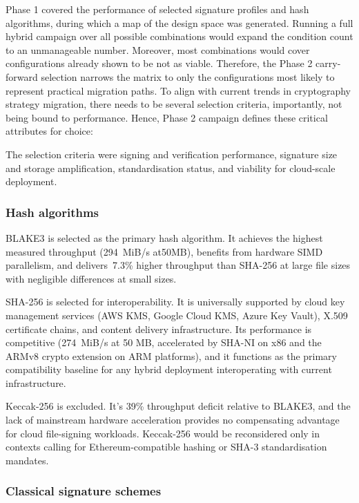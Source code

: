 \documentclass[12pt,a4paper]{article}
\begin{document}
Phase 1 covered the performance of selected signature profiles and hash algorithms, during which a map of the design space was generated. Running a full hybrid campaign over all possible combinations would expand the condition count to an unmanageable number. Moreover, most combinations would cover configurations already shown to be not as viable. Therefore, the Phase 2 carry-forward selection narrows the matrix to only the configurations most likely to represent practical migration paths. To align with current trends in cryptography strategy migration, there needs to be several selection criteria, importantly, not being bound to performance. Hence, Phase 2 campaign defines these critical attributes for choice:

The selection criteria were signing and verification performance, signature size and storage amplification, standardisation status, and viability for cloud-scale deployment.

\subsubsection{Hash algorithms}

BLAKE3 is selected as the primary hash algorithm. It achieves the highest measured throughput (294~MiB/s at50MB), benefits from hardware SIMD parallelism, and delivers~7.3\% higher throughput than SHA-256 at large file sizes with negligible differences at small sizes.

SHA-256 is selected for interoperability. It is universally supported by cloud key management services (AWS KMS, Google Cloud KMS, Azure Key Vault), X.509 certificate chains, and content delivery infrastructure. Its performance is competitive (274~MiB/s at 50 MB, accelerated by SHA-NI on x86 and the ARMv8 crypto extension on ARM platforms), and it functions as the primary compatibility baseline for any hybrid deployment interoperating with current infrastructure.

Keccak-256 is excluded. It's 39\% throughput deficit relative to BLAKE3, and the lack of mainstream hardware acceleration provides no compensating advantage for cloud file-signing workloads. Keccak-256 would be reconsidered only in contexts calling for Ethereum-compatible hashing or SHA-3 standardisation mandates.

\subsubsection{Classical signature schemes}
\end{document}
